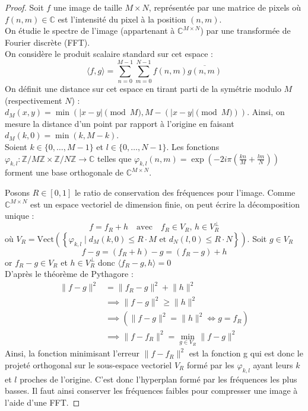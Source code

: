 \label{demo6}
\begin{proof}
    Soit $f$ une image de taille $M \times N$, représentée par une matrice de pixels où $f(n, m) \in \mathbb{C}$ est l'intensité du pixel à la position $(n, m)$. \\
    On étudie le spectre de l'image (appartenant à $\mathbb{C}^{M\times N}$) par une transformée de Fourier discrète (FFT). \\
    On considère le produit scalaire standard sur cet espace : 
    $$ \langle f,g \rangle = \sum_{n=0}^{M-1}\sum_{m=0}^{N-1}f(n,m)\overline{g(n,m)}$$
    On définit une distance sur cet espace en tirant parti de la symétrie modulo $M$ (respectivement $N$) : $d_M(x, y) = \min(|x - y| \pmod M, M - (|x - y| \pmod M))$. Ainsi, on mesure la distance d'un point par rapport à l'origine en faisant $d_M(k,0)=\min(k,M-k)$. \\
    Soient $k \in \{0, \dots, M-1\}$ et $l \in \{0, \dots, N-1\}$. Les fonctions $\varphi_{k,l}: \mathbb{Z}/M\mathbb{Z} \times \mathbb{Z}/N\mathbb{Z} \to \mathbb{C}$ telles que $\varphi_{k,l}(n,m)=\exp\left(-2i\pi \left(\frac{kn}{M} + \frac{lm}{N}\right)\right)$ forment une base orthogonale de $\mathbb{C}^{M\times N}$.
    
    Posons $R \in [0,1]$ le ratio de conservation des fréquences pour l'image.
    Comme $\mathbb{C}^{M\times N}$ est un espace vectoriel de dimension finie, on peut écrire la décomposition unique : 
    $$f = f_R + h \quad \text{avec} \quad f_R \in V_R, \, h \in V_R^{\perp}$$ 
    où $V_R = \text{Vect}\left(\left\{\varphi_{k,l} \mid d_M(k,0) \leq R \cdot M \text{ et } d_N(l,0) \leq R \cdot N\right\}\right)$.
    Soit $g \in V_R$ \\
    $$f-g=(f_R+h)-g=(f_R-g)+h$$ or $f_R-g \in V_R$ et $h \in V_R^{\perp}$ donc $\langle f_R-g, h \rangle = 0$ \\
    D'après le théorème de Pythagore : 
    \begin{align*}
        \lVert f-g \rVert^2 &= \lVert f_R-g \rVert^2 + \lVert h \rVert^2 \\
                            &\implies \lVert f-g \rVert^2 \geq \lVert h \rVert^2 \\
                            &\implies (\lVert f-g \rVert^2 = \lVert h \rVert^2 \iff g = f_R) \\
                            &\implies \lVert f-f_R \rVert^2 = \min_{g \in V_R} \lVert f-g \rVert^2
    \end{align*}
    Ainsi, la fonction minimisant l'erreur $\lVert f-f_R \rVert^2$ est la fonction g qui est donc le projeté orthogonal sur le sous-espace vectoriel $V_R$ formé par les $\varphi_{k,l}$ ayant leurs $k$ et $l$ proches de l'origine. C'est donc l'hyperplan formé par les fréquences les plus basses. Il faut ainsi conserver les fréquences faibles pour compresser une image à l'aide d'une FFT.
    
\end{proof}